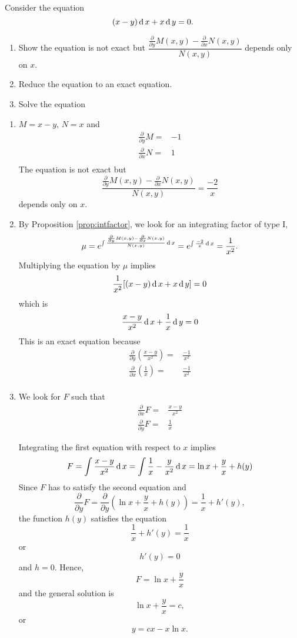 \begin{exercise}
	Consider the equation
	\[ (x-y)  \operatorname{d} x +  x \operatorname{d} y =0. \]
	\begin{enumerate}
		\item  Show the equation is not exact but $\dfrac{\frac{\partial}{\partial y} M(x,y) - \frac{\partial}{\partial x} N(x,y)}{N(x,y)}$ depends only on $x$.
		\item Reduce the equation to an exact equation.
		\item Solve the equation
	\end{enumerate}
\end{exercise}
\begin{exersol}
	\begin{enumerate}
		\item $M=x-y$, $N=x$ and 
		\[
		\begin{split}
		\frac{\partial}{\partial y} M =&-1 \\
		\frac{\partial}{\partial x} N =&1 \\
		\end{split}
		\]
		The equation is not exact but
		\[ \frac{\frac{\partial}{\partial y} M(x,y) - \frac{\partial}{\partial x} N(x,y)}{N(x,y)}=  \frac{-2}{x}\] 
		depends only on $x$.
		\item By Proposition \ref{prop:intfactor}, 
			we look for an integrating factor of type I, 
		\[\mu = e^{\int \frac{\frac{\partial}{\partial y} M(x,y) - \frac{\partial}{\partial x} N(x,y)}{N(x,y)}\operatorname{d} x} = e^{\int  \frac{-2}{x}\operatorname{d} x} = \frac{1}{x^2}. \]
		Multiplying the equation by $\mu$ implies
		\[ \frac{1}{x^2} [(x- y)  \operatorname{d} x +  x \operatorname{d} y] = 0  \]
		which is 
		\[  \frac{x-y}{x^2}  \operatorname{d} x+  \frac{1}{x} \operatorname{d} y= 0  \]
		This is an exact equation because
		\[
		\begin{split}
		\frac{\partial}{\partial y} (  \frac{x-y}{x^2} ) =&\frac{-1}{x^2} \\
		\frac{\partial}{\partial x} (\frac{1}{x})=&\frac{-1}{x^2} \\
		\end{split}
		\]
		\item 
		We look for $F$ such that
		\[
		\begin{split}
		\frac{\partial}{\partial x} F =& \frac{x-y}{x^2}\\
		\frac{\partial}{\partial y} F  =& \frac{1}{x}
		\end{split}
		\]
		
		Integrating the first equation with respect to $x$ implies
		\[  
		F = \int  \frac{x-y}{x^2} \operatorname{d} x =\int  \frac{1}{x}-\frac{y}{x^2} \operatorname{d} x =\ln x+ \frac{y}{x} + h(y)
		\]
		Since $F$ has to satisfy the second equation and 
		\[
		\frac{\partial}{\partial y} F = \frac{\partial}{\partial y} (\ln x+ \frac{y}{x} + h(y)) = \frac{1}{x} + h'(y),
		\]
		the function $h(y)$ satisfies the equation
		\[\frac{1}{x} + h'(y) =\frac{1}{x} \]
		or 
		\[ h'(y) =0 \]
		and $h=0$. Hence, 
		\[
		F=\ln x + \frac{y}{x}
		\]
		and the general solution is 
		\[
		\ln x + \frac{y}{x} = c,
		\]
    or
    \[y=cx-x\ln x.\]
	\end{enumerate}
\end{exersol}

